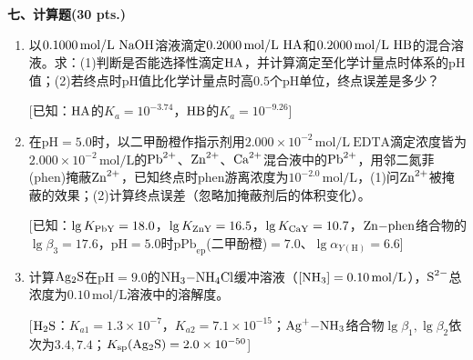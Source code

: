 \vspace{0.5cm}
\noindent\textbf{七、计算题(30 pts.)}

\begin{enumerate}[label=\arabic*., itemsep=1.5ex]
    \item 以$0.1000\,\text{mol/L}\ \ce{NaOH}$溶液滴定$0.2000\,\text{mol/L}\ \ce{HA}$和$0.2000\,\text{mol/L}\ \ce{HB}$的混合溶液。求：(1)判断是否能选择性滴定$\ce{HA}$，并计算滴定至化学计量点时体系的$\text{pH}$值；(2)若终点时$\text{pH}$值比化学计量点时高$0.5$个$\text{pH}$单位，终点误差是多少？
    
    [已知：$\ce{HA}$的$K_a=10^{-3.74}$，$\ce{HB}$的$K_a=10^{-9.26}$]
    \item 在$\text{pH}=5.0$时，以二甲酚橙作指示剂用$2.000\times10^{-2}\,\text{mol/L}\ \text{EDTA}$滴定浓度皆为$2.000\times10^{-2}\,\text{mol/L}$的$\ce{Pb^{2+}}$、$\ce{Zn^{2+}}$、$\ce{Ca^{2+}}$混合液中的$\ce{Pb^{2+}}$，用邻二氮菲(phen)掩蔽$\ce{Zn^{2+}}$，已知终点时phen游离浓度为$10^{-2.0}\,\text{mol/L}$，(1)问$\ce{Zn^{2+}}$被掩蔽的效果；(2)计算终点误差（忽略加掩蔽剂后的体积变化）。
    
    [已知：$\lg K_{\ce{PbY}}=18.0$，$\lg K_{\ce{ZnY}}=16.5$，$\lg K_{\ce{CaY}}=10.7$，$\ce{Zn-phen}$络合物的$\lg\beta_3=17.6$，$\text{pH}=5.0$时$\text{pPb}_\text{ep}$(二甲酚橙)$=7.0$、$\lg\alpha_{Y(\text{H})}=6.6$]
    \item 计算$\ce{Ag2S}$在$\text{pH}=9.0$的$\ce{NH3-NH4Cl}$缓冲溶液（$[\ce{NH3}]=0.10\,\text{mol/L}$），$\ce{S^{2-}}$总浓度为$0.10\,\text{mol/L}$溶液中的溶解度。
    
    [$\ce{H2S}$：$K_{a1}=1.3\times10^{-7}$，$K_{a2}=7.1\times10^{-15}$；$\ce{Ag^+-NH3}$络合物$\lg\beta_1,\lg\beta_2$依次为$3.4,7.4$；$K_{\text{sp}}(\ce{Ag2S})=2.0\times10^{-50}$]
\end{enumerate}
